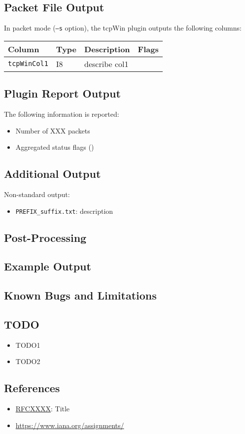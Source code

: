 \documentclass[documentation]{subfiles}
\begin{document}
\subsection{Packet File Output}
In packet mode ({\tt --s} option), the tcpWin plugin outputs the following columns:
\begin{longtable}{llll}
    \toprule
    {\bf Column} & {\bf Type} & {\bf Description} & {\bf Flags}\\
    \midrule\endhead%
    {\tt tcpWinCol1} & I8 & describe col1 & \\
    \bottomrule
\end{longtable}

\subsection{Plugin Report Output}
The following information is reported:
\begin{itemize}
    \item Number of XXX packets
    \item Aggregated status flags ({\tt{}})
\end{itemize}

\subsection{Additional Output}
Non-standard output:
\begin{itemize}
    \item {\tt PREFIX\_suffix.txt}: description
\end{itemize}

\subsection{Post-Processing}

\subsection{Example Output}

\subsection{Known Bugs and Limitations}

\subsection{TODO}
\begin{itemize}
    \item TODO1
    \item TODO2
\end{itemize}

\subsection{References}
\begin{itemize}
    \item \href{https://tools.ietf.org/html/rfcXXXX}{RFCXXXX}: Title
    \item \url{https://www.iana.org/assignments/}
\end{itemize}
\end{document}
